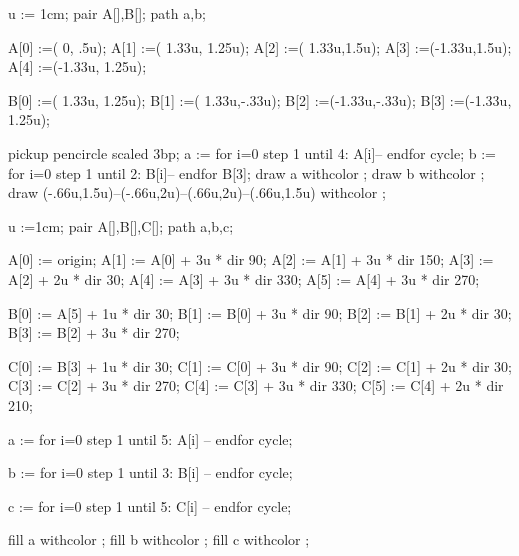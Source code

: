 u := 1cm;
pair A[],B[];
path a,b;

A[0] :=(     0, .5u);
A[1] :=( 1.33u, 1.25u);
A[2] :=( 1.33u,1.5u);
A[3] :=(-1.33u,1.5u);
A[4] :=(-1.33u, 1.25u);

B[0] :=( 1.33u, 1.25u);
B[1] :=( 1.33u,-.33u);
B[2] :=(-1.33u,-.33u);
B[3] :=(-1.33u, 1.25u);

pickup pencircle scaled 3bp;
a := for i=0 step 1 until 4:
	A[i]--
endfor cycle;
b := for i=0 step 1 until 2:
	B[i]--
endfor B[3];
draw a withcolor ;
draw b withcolor ;
draw (-.66u,1.5u)--(-.66u,2u)--(.66u,2u)--(.66u,1.5u) withcolor ;
\stopreusableMPgraphic

u :=1cm;
pair A[],B[],C[];
path a,b,c;


A[0] := origin;
A[1] := A[0] + 3u * dir 90;
A[2] := A[1] + 3u * dir 150;
A[3] := A[2] + 2u * dir 30;
A[4] := A[3] + 3u * dir 330;
A[5] := A[4] + 3u * dir 270;

B[0] := A[5] + 1u * dir 30;
B[1] := B[0] + 3u * dir 90;
B[2] := B[1] + 2u * dir 30;
B[3] := B[2] + 3u * dir 270;

C[0] := B[3] + 1u * dir 30;
C[1] := C[0] + 3u * dir 90;
C[2] := C[1] + 2u * dir 30;
C[3] := C[2] + 3u * dir 270;
C[4] := C[3] + 3u * dir 330;
C[5] := C[4] + 2u * dir 210;

a := for i=0 step 1 until 5:
A[i] --
endfor cycle;

b := for i=0 step 1 until 3:
B[i] --
endfor cycle;

c := for i=0 step 1 until 5:
C[i] --
endfor cycle;

fill a withcolor ;
fill b withcolor ;
fill c withcolor ;

\stopreusableMPgraphic

\stopenvironment
